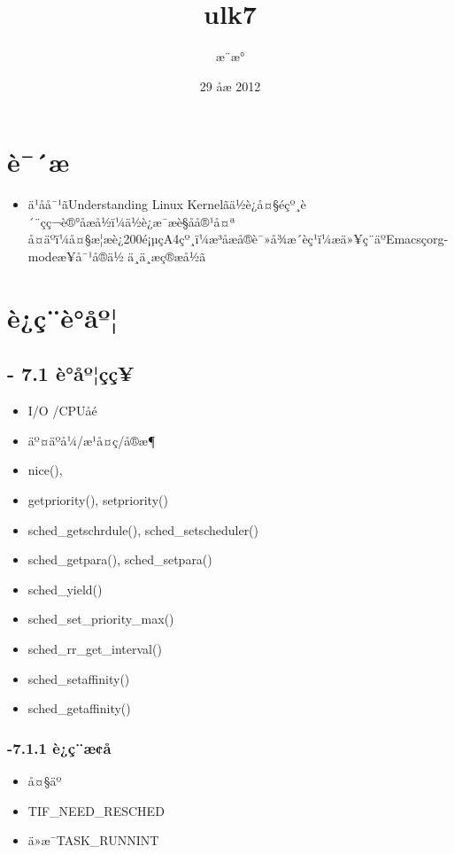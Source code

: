 \documentclass[11pt]{article}
\title{ulk7}
\author{æ¨æ°}
\date{29 åæ 2012}
\begin{document}
\maketitle

\setcounter{tocdepth}{3}
\tableofcontents
\vspace*{1cm}
\section{è¯´æ}
\label{sec-1}

\begin{itemize}
\item ä¹åå¯¹ãUnderstanding Linux Kernelãä½è¿å¤§éçº¸è´¨çç¬è®°åæå½ï¼ä½è¿æ¯æè§åå®¹å¤ª
  å¤äºï¼å¤§æ¦æè¿200é¡µçA4çº¸ï¼æ³åæå®è¯»å¾æ´èç¹ï¼æä»¥ç¨äºEmacsçorg-modeæ¥å¯¹å®ä½
  ä¸ä¸æç®æå½ã
\end{itemize}
\section{è¿ç¨è°åº¦}
\label{sec-2}

\subsection{- 7.1 è°åº¦ç­ç¥}
\label{sec-2.1}

\begin{itemize}
\item I/O /CPUåé
\item äº¤äºå¼/æ¹å¤ç/å®æ¶
\item nice(),
\item getpriority(), setpriority()
\item sched\_getschrdule(), sched\_setscheduler()
\item sched\_getpara(), sched\_setpara()
\item sched\_yield()
\item sched\_set\_priority\_max()
\item sched\_rr\_get\_interval()
\item sched\_setaffinity()
\item sched\_getaffinity()
\end{itemize}
\subsubsection{-7.1.1 è¿ç¨æ¢å }
\label{sec-2.1.1}

\begin{itemize}
\item å¤§äº
\item TIF\_NEED\_RESCHED
\item ä»æ¯TASK\_RUNNINT
\end{itemize}
\end{document}
